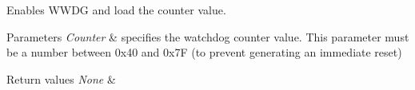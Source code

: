 Enables W\+W\+D\+G and load the counter value. 


\begin{DoxyParams}{Parameters}
{\em Counter} & specifies the watchdog counter value. This parameter must be a number between 0x40 and 0x7\+F (to prevent generating an immediate reset) \\
\hline
\end{DoxyParams}

\begin{DoxyRetVals}{Return values}
{\em None} & \\
\hline
\end{DoxyRetVals}

